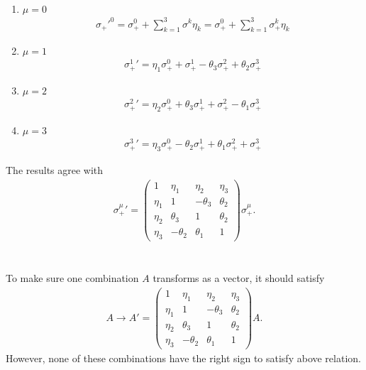 \documentclass[11pt]{article}
\begin{document}
\begin{enumerate}
    \item $\mu=0$
    \begin{eqnarray}
        {\sigma_+'}^0 =\sigma_+^0+\sum_{k=1}^3\sigma^k\eta_k=\sigma_+^0+\sum_{k=1}^3\sigma_+^k\eta_k
    \end{eqnarray}
    \item $\mu=1$
    \begin{eqnarray}
        {\sigma_+^1}'=\eta_1\sigma_+^0+\sigma_+^1-\theta_3\sigma_+^2+\theta_2\sigma_+^3
    \end{eqnarray}
    \item $\mu=2$
    \begin{eqnarray}
        {\sigma_+^2}'=\eta_2\sigma_+^0+\theta_3\sigma_+^1+\sigma_+^2-\theta_1\sigma_+^3
    \end{eqnarray}
    \item $\mu=3$
    \begin{eqnarray}
        {\sigma_+^3}'=\eta_3\sigma_+^0-\theta_2\sigma_+^1+\theta_1\sigma_+^2+\sigma_+^3
    \end{eqnarray}
\end{enumerate}
The results agree with
\begin{eqnarray}
    {\sigma_+^\mu}'=
    \begin{pmatrix}
        1 & \eta_1 & \eta_2 & \eta_3 \\
        \eta_1 & 1 & -\theta_3 & \theta_2 \\
        \eta_2 & \theta_3 & 1 & \theta_2 \\
        \eta_3 & -\theta_2 & \theta_1 & 1
    \end{pmatrix}
    \sigma_+^\mu.
\end{eqnarray}

\section{ }
To make sure one combination $A$ transforms as a vector, it should satisfy
\begin{eqnarray}
    A \to A'=
    \begin{pmatrix}
        1 & \eta_1 & \eta_2 & \eta_3 \\
        \eta_1 & 1 & -\theta_3 & \theta_2 \\
        \eta_2 & \theta_3 & 1 & \theta_2 \\
        \eta_3 & -\theta_2 & \theta_1 & 1
    \end{pmatrix}
    A.
\end{eqnarray}
However, none of these combinations have the right sign to satisfy above relation.
\end{document}
